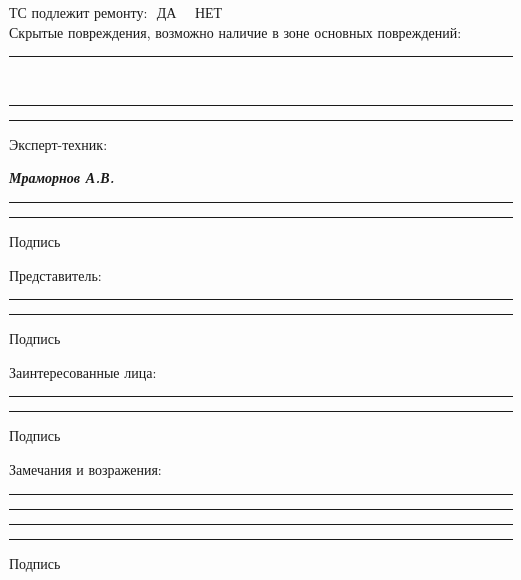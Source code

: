 \documentclass[a4paper,10pt]{report}
\begin{document}
\noindent ТС подлежит ремонту:\,\, ДА\, {\large {}}\,\,\, НЕТ {\large {}}\\
\noindent Скрытые повреждения, возможно наличие в зоне основных повреждений: \rule{50mm}{0.1mm}\\
\rule{170mm}{0.1mm}
\rule{170mm}{0.1mm}

\vspace{3mm}
\begin{tcolorbox}[title=\textsl{Подписи и замечания сторон},leftrule=0pt,rightrule=0pt,toprule=0pt,titlerule=0pt,sharp corners,
	colback=white,colframe=white,coltitle=black,colbacktitle=YellowOrange]
\end{tcolorbox}
\vspace{-5mm}
\centering
\raggedright Эксперт-техник: \\ \hspace{1.7cm}
\raggedright\textbf{\textsl{ Мраморнов А.В. }}
\vspace{-3mm}

\centering 
\rule{50mm}{0.1mm} \hspace{5cm} \rule{50mm}{0.1mm}

\hspace{10.5cm} {\footnotesize Подпись}

\vspace{0mm}
\centering
\raggedright Представитель: \\ \hspace{1.7cm}
\raggedright\textbf{  }
\vspace{-3mm}

\centering 
\rule{50mm}{0.1mm} \hspace{5cm} \rule{50mm}{0.1mm}

\hspace{10.5cm} {\footnotesize Подпись}

\vspace{0mm}
\centering
\raggedright Заинтересованные лица: \\ \hspace{1.7cm}
\raggedright\textbf{  }
\vspace{-3mm}

\centering 
\rule{50mm}{0.1mm} \hspace{5cm} \rule{50mm}{0.1mm}

\hspace{10.5cm} {\footnotesize Подпись}

\vspace{5mm}

\raggedright
Замечания и возражения: 

\rule{175mm}{0.1mm}
\rule{175mm}{0.1mm}
\rule{175mm}{0.1mm}

\vspace{5mm}
\hspace{11cm} \rule{50mm}{0.1mm}

\hspace{13cm} {\footnotesize Подпись}
\end{document}
